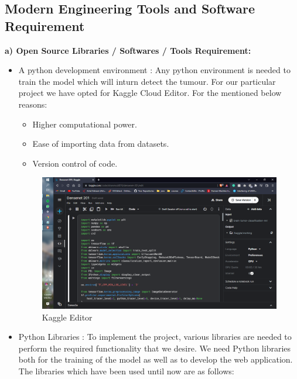 \subsection{Modern Engineering Tools and Software Requirement}
{\textbf{a) Open Source Libraries / Softwares / Tools Requirement:}}
\begin{itemize}
    \item A python development environment : Any python environment is needed to train the model which will inturn detect the tumour. For our particular project we have opted for Kaggle Cloud Editor. For the mentioned below reasons:
        \begin{itemize}
            \item Higher computational power.
            \item Ease of importing data from datasets.
            \item Version control of code.
        \end{itemize}
        \begin{figure}[H]
        \includegraphics[scale=0.3]{Photos/Kaggle_Editor2.png}
        \caption{Kaggle Editor} \label{fig:ishan}
        \end{figure}
    \item Python Libraries : To implement the project, various libraries are needed to perform the required functionality that we desire. We need Python libraries both for the training of the model as well as to develop the web application. The libraries which have been used until now are as follows:

\end{itemize}
